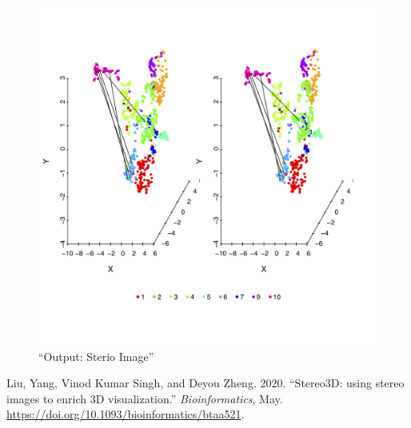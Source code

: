 \documentclass[]{article}
\begin{document}
\begin{figure}
\centering
\includegraphics{./sample_3D_data_Stereo_net.png}
\caption{``Output: Sterio Image''}
\end{figure}

\hypertarget{refs}{}
\leavevmode\hypertarget{ref-10.1093ux2fbioinformaticsux2fbtaa521}{}%
Liu, Yang, Vinod Kumar Singh, and Deyou Zheng. 2020. ``Stereo3D: using
stereo images to enrich 3D visualization.'' \emph{Bioinformatics}, May.
\url{https://doi.org/10.1093/bioinformatics/btaa521}.
\end{document}
